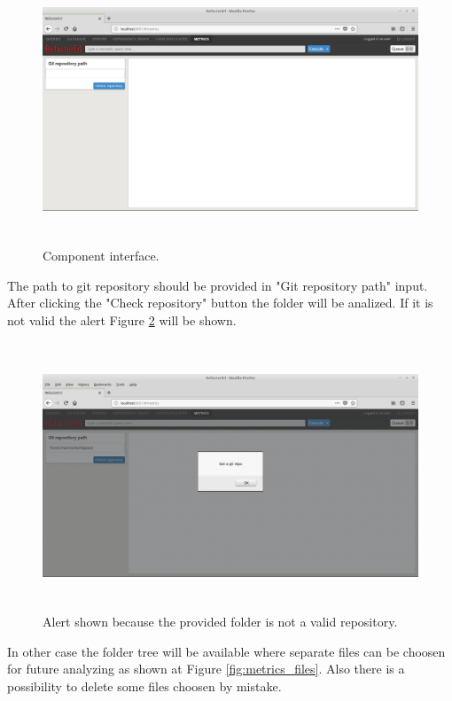 \begin{figure}[h]
	\includegraphics[height=80mm]{figures/metrics.png}
	\caption{Component interface.}
	\label{fig:metrics_interface}
\end{figure}

The path to git repository should be provided in "Git repository path" input. After clicking the "Check repository" button the folder will be analized. If it is not valid the alert Figure \ref{fig:metrics_alert} will be shown.  

\begin{figure}[h]
	\includegraphics[height=80mm]{figures/alert.png}
	\caption{Alert shown because the provided folder is not a valid repository.}
	\label{fig:metrics_alert}
\end{figure}

In other case the folder tree will be available where separate files can be choosen for future analyzing as shown at Figure \ref{fig:metrics_files}. Also there is a possibility to delete some files choosen by mistake.

